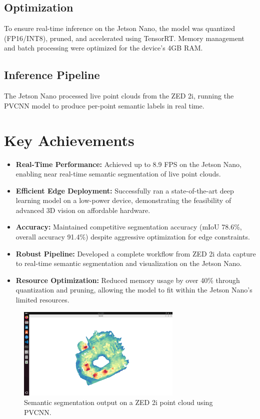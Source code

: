\documentclass[12pt,a4paper]{report}
\begin{document}
\section{Optimization}
To ensure real-time inference on the Jetson Nano, the model was quantized (FP16/INT8), pruned, and accelerated using TensorRT. Memory management and batch processing were optimized for the device’s 4GB RAM.

\section{Inference Pipeline}
The Jetson Nano processed live point clouds from the ZED 2i, running the PVCNN model to produce per-point semantic labels in real time.

\chapter{Key Achievements}
\begin{itemize}
    \item \textbf{Real-Time Performance:} Achieved up to 8.9 FPS on the Jetson Nano, enabling near real-time semantic segmentation of live point clouds.
    \item \textbf{Efficient Edge Deployment:} Successfully ran a state-of-the-art deep learning model on a low-power device, demonstrating the feasibility of advanced 3D vision on affordable hardware.
    \item \textbf{Accuracy:} Maintained competitive segmentation accuracy (mIoU 78.6\%, overall accuracy 91.4\%) despite aggressive optimization for edge constraints.
    \item \textbf{Robust Pipeline:} Developed a complete workflow from ZED 2i data capture to real-time semantic segmentation and visualization on the Jetson Nano.
    \item \textbf{Resource Optimization:} Reduced memory usage by over 40\% through quantization and pruning, allowing the model to fit within the Jetson Nano’s limited resources.
\end{itemize}

\begin{figure}[htbp]
    \centering
    \includegraphics[width=0.7\textwidth]{figures/pointcloud_visualisation_sonata_demo.png}
    \caption{Semantic segmentation output on a ZED 2i point cloud using PVCNN.}
    \label{fig:segmentation_output}
\end{figure}
\end{document}
